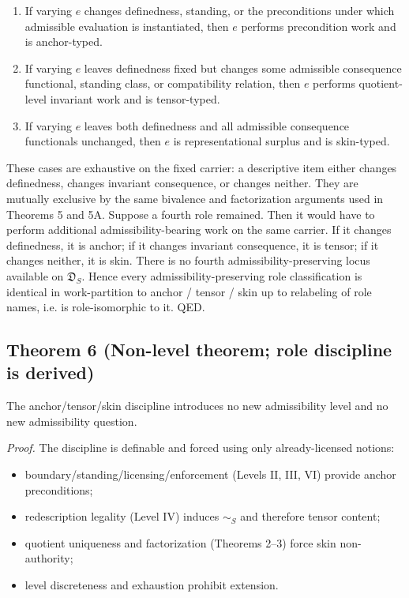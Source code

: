 \documentclass[12pt]{article}
\theoremstyle{plain}
\begin{document}
\begin{enumerate}[leftmargin=*]
\item If varying $e$ changes definedness, standing, or the preconditions under which admissible evaluation is instantiated, then $e$ performs precondition work and is anchor-typed.
\item If varying $e$ leaves definedness fixed but changes some admissible consequence functional, standing class, or compatibility relation, then $e$ performs quotient-level invariant work and is tensor-typed.
\item If varying $e$ leaves both definedness and all admissible consequence functionals unchanged, then $e$ is representational surplus and is skin-typed.
\end{enumerate}

These cases are exhaustive on the fixed carrier: a descriptive item either changes definedness, changes invariant consequence, or changes neither. They are mutually exclusive by the same bivalence and factorization arguments used in Theorems 5 and 5A. Suppose a fourth role remained. Then it would have to perform additional admissibility-bearing work on the same carrier. If it changes definedness, it is anchor; if it changes invariant consequence, it is tensor; if it changes neither, it is skin. There is no fourth admissibility-preserving locus available on $\mathfrak{D}_S$. Hence every admissibility-preserving role classification is identical in work-partition to anchor / tensor / skin up to relabeling of role names, i.e. is role-isomorphic to it. QED.

\subsection{Theorem 6 (Non-level theorem; role discipline is derived)}

The anchor/tensor/skin discipline introduces no new admissibility level and no new admissibility question.

\textit{Proof.} The discipline is definable and forced using only already-licensed notions:

\begin{itemize}[leftmargin=*]
\item boundary/standing/licensing/enforcement (Levels II, III, VI) provide anchor preconditions;
\item redescription legality (Level IV) induces $\sim_S$ and therefore tensor content;
\item quotient uniqueness and factorization (Theorems 2--3) force skin non-authority;
\item level discreteness and exhaustion prohibit extension.
\end{itemize}
\end{document}
